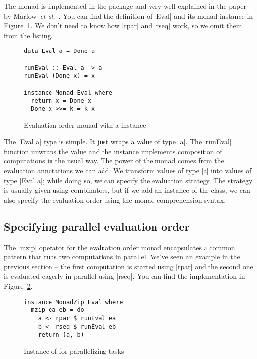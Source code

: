 \documentclass{tmr}
\newcommand{\etal}{\textit{et al.}}
\begin{document}
The  monad is implemented in the  package \cite{parallelpkg} and very 
well explained in the paper by Marlow~\etal~\cite{strategies-new}. You can find the definition of 
|Eval| and its monad instance in Figure~\ref{fig:eval-monad}. We don't need to know how 
|rpar| and |rseq| work, so we omit them from the listing. 

\begin{figure}
\begin{verbatim}
data Eval a = Done a

runEval :: Eval a -> a
runEval (Done x) = x

instance Monad Eval where
  return x = Done x
  Done x >>= k = k x
\end{verbatim}
\caption{ Evaluation-order monad  with a  instance }
\label{fig:eval-monad}
\end{figure}

The |Eval a| type is simple. It just wraps a value of type |a|. The |runEval| function unwraps 
the value and the  instance implements composition of computations in the 
usual way. The power of the monad comes from the evaluation annotations we can add.
We transform values of type |a| into values of type |Eval a|; while doing so, we can specify 
the evaluation strategy. The strategy is usually given using combinators, but if we add an 
instance of the  class, we can also specify the evaluation order using the monad 
comprehension syntax.


\subsection{Specifying parallel evaluation order}

The |mzip| operator for the evaluation order monad encapsulates a common pattern that runs two
computations in parallel. We've seen an example in the previous section -- the first 
computation is started using |rpar| and the second one is evaluated eagerly in parallel using |rseq|.
You can find the implementation in Figure~\ref{fig:eval-zip}.

\begin{figure}
\begin{verbatim}
instance MonadZip Eval where
  mzip ea eb = do
    a <- rpar $ runEval ea
    b <- rseq $ runEval eb
    return (a, b)
\end{verbatim}
\caption{Instance of  for parallelizing tasks}
\label{fig:eval-zip}
\end{figure}
\end{document}
